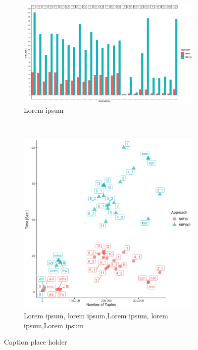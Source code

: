 %
%
%


\begin{figure}[t!]
    \centering
    \begin{subfigure}[t]{0.5\textwidth}
        \centering
        \includegraphics[width=\textwidth]{figs/plots/enron-nbfi-comp-f.png}
        \caption{Lorem ipsum}
    \end{subfigure}%
    ~ 
    \begin{subfigure}[t]{0.5\textwidth}
        \centering
        \includegraphics[scale=0.09]{figs/plots/enron-nbfi-f-comp-scatter.png}
        \caption{Lorem ipsum, lorem ipsum,Lorem ipsum, lorem ipsum,Lorem ipsum}
    \end{subfigure}
    \caption{Caption place holder}
\end{figure}

